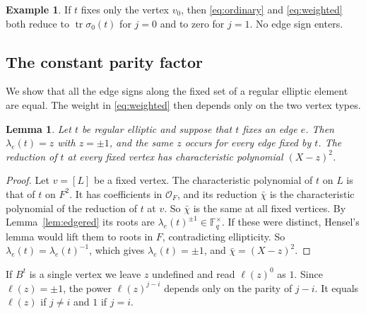 \documentclass[12pt,letterpaper]{article}
\numberwithin{equation}{section}
\newtheorem{lemma}[theorem]{Lemma}
\theoremstyle{definition}
\newtheorem{example}[theorem]{Example}
\theoremstyle{remark}
\newcommand{\OO}{\mathcal O_F}
\newcommand{\kk}{\mathbb F_q}
\newcommand{\tr}{\operatorname{tr}}
\begin{document}
\begin{example}
If $t$ fixes only the vertex $v_0$, then \eqref{eq:ordinary} and \eqref{eq:weighted} both reduce to $\tr\sigma_0(t)$ for $j=0$ and to zero for $j=1$. No edge sign enters.
\end{example}

\subsection{The constant parity factor}
We show that all the edge signs along the fixed set of a regular elliptic element are equal. The weight in \eqref{eq:weighted} then depends only on the two vertex types.

\begin{lemma}\label{lem:repeated}
Let $t$ be regular elliptic and suppose that $t$ fixes an edge $e$. Then $\lambda_e(t)=z$ with $z=\pm1$, and the same $z$ occurs for every edge fixed by $t$. The reduction of $t$ at every fixed vertex has characteristic polynomial $(X-z)^2$.
\end{lemma}
\begin{proof}
Let $v=[L]$ be a fixed vertex. The characteristic polynomial of $t$ on $L$ is that of $t$ on $F^2$. It has coefficients in $\OO$, and its reduction $\bar\chi$ is the characteristic polynomial of the reduction of $t$ at $v$. So $\bar\chi$ is the same at all fixed vertices. By Lemma~\ref{lem:edgered} its roots are $\lambda_e(t)^{\pm1}\in\kk^\times$. If these were distinct, Hensel's lemma would lift them to roots in $F$, contradicting ellipticity. So $\lambda_e(t)=\lambda_e(t)^{-1}$, which gives $\lambda_e(t)=\pm1$, and $\bar\chi=(X-z)^2$.
\end{proof}

If $B^t$ is a single vertex we leave $z$ undefined and read $\ell(z)^0$ as $1$. Since $\ell(z)=\pm1$, the power $\ell(z)^{j-i}$ depends only on the parity of $j-i$. It equals $\ell(z)$ if $j\ne i$ and $1$ if $j=i$.
\end{document}
